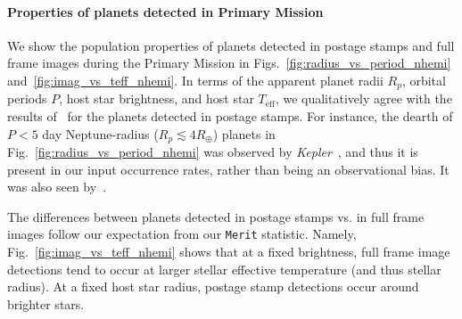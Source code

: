 \paragraph{Properties of planets detected in Primary Mission} 

We show the population properties of planets detected in postage
stamps and full frame images during the Primary Mission in
Figs.~\ref{fig:radius_vs_period_nhemi}
and~\ref{fig:imag_vs_teff_nhemi}.  In terms of the apparent planet
radii $R_p$, orbital periods $P$, host star brightness, and host star
$T_\mathrm{eff}$, we qualitatively agree with the results
of~ for the planets detected
in postage stamps. 
For instance, the dearth of $P<5$ day
Neptune-radius ($R_p \lesssim 4R_\oplus$) planets in 
Fig.~\ref{fig:radius_vs_period_nhemi} was
observed by \textit{Kepler}~\citep{mazeh_dearth_2016}, and thus it is
present in our input occurrence rates, rather than being an
observational bias.  It was also seen by~.

The differences between planets detected in postage stamps vs. in full frame images follow our expectation from our \texttt{Merit} statistic. 
Namely, Fig.~\ref{fig:imag_vs_teff_nhemi} shows that at a fixed brightness, full frame image detections tend to occur at larger stellar effective temperature (and thus stellar radius).
At a fixed host star radius, postage stamp detections occur around brighter stars.


